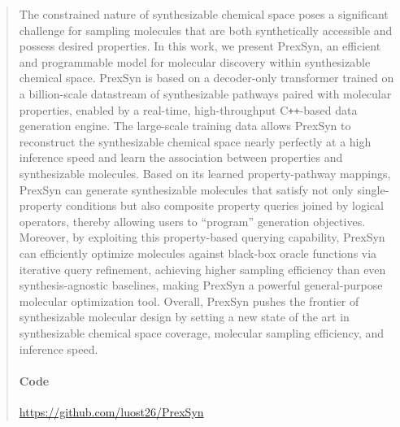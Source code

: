 \begin{abstract}
The constrained nature of synthesizable chemical space poses a significant challenge for sampling molecules that are both synthetically accessible and possess desired properties.
In this work, we present PrexSyn, an efficient and programmable model for molecular discovery within synthesizable chemical space.
PrexSyn is based on a decoder-only transformer trained on a billion-scale datastream of synthesizable pathways paired with molecular properties, enabled by a real-time, high-throughput C\texttt{++}-based data generation engine.
The large-scale training data allows PrexSyn to reconstruct the synthesizable chemical space nearly perfectly at a high inference speed and learn the association between properties and synthesizable molecules.
Based on its learned property-pathway mappings, PrexSyn can generate synthesizable molecules that satisfy not only single-property conditions but also composite property queries joined by logical operators, thereby allowing users to ``program'' generation objectives.
Moreover, by exploiting this property-based querying capability, PrexSyn can efficiently optimize molecules against black-box oracle functions via iterative query refinement, achieving higher sampling efficiency than even synthesis-agnostic baselines, making PrexSyn a powerful general-purpose molecular optimization tool.
Overall, PrexSyn pushes the frontier of synthesizable molecular design by setting a new state of the art in synthesizable chemical space coverage, molecular sampling efficiency, and inference speed.
\paragraph{Code}\url{https://github.com/luost26/PrexSyn}
\end{abstract}

